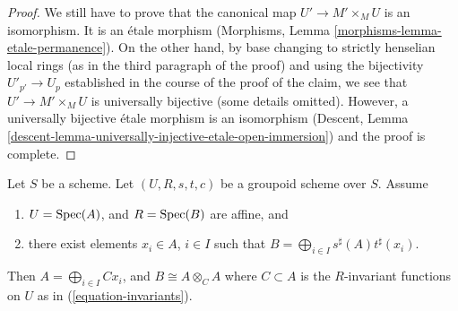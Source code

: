 \begin{proof}
\medskip\noindent
We still have to prove that the canonical map $U' \to M' \times_M U$
is an isomorphism. It is an \'etale morphism
(Morphisms, Lemma \ref{morphisms-lemma-etale-permanence}).
On the other hand, by base changing to strictly henselian local rings
(as in the third paragraph of the proof) and using the bijectivity
$U'_{p'} \to U_p$ established in the course of the proof of the claim,
we see that $U' \to M' \times_M U$ is universally bijective
(some details omitted). However, a universally bijective
\'etale morphism is an isomorphism
(Descent, Lemma \ref{descent-lemma-universally-injective-etale-open-immersion})
and the proof is complete.
\end{proof}

\begin{lemma}
\label{lemma-basis}
Let $S$ be a scheme.
Let $(U, R, s, t, c)$ be a groupoid scheme over $S$.
Assume
\begin{enumerate}
\item $U = \mathop{\mathrm{Spec}}(A)$, and $R = \mathop{\mathrm{Spec}}(B)$ are affine, and
\item there exist elements $x_i \in A$, $i \in I$ such that
$B = \bigoplus_{i \in I} s^\sharp(A)t^\sharp(x_i)$.
\end{enumerate}
Then $A = \bigoplus_{i\in I} Cx_i$, and $B \cong A \otimes_C A$
where $C \subset A$ is the $R$-invariant
functions on $U$ as in (\ref{equation-invariants}).
\end{lemma}

